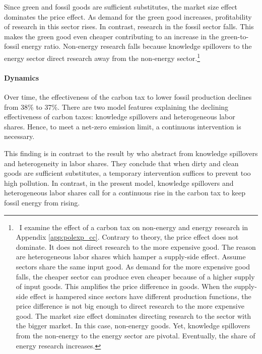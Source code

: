  Since green and fossil goods are sufficient substitutes, the market size effect dominates the price effect. As demand for the green good increases, profitability of research in  this sector rises. In contrast, research in the fossil sector falls. This makes the green good even cheaper contributing to an increase in the green-to-fossil energy ratio.
Non-energy research falls because knowledge spillovers to the energy sector direct research away from the non-energy sector.\footnote{\ I examine the effect of a carbon tax on non-energy and energy research in Appendix \ref{app:polexp_cc}. Contrary to theory, the price effect does not dominate. It does not direct research to the more expensive good. The reason are heterogeneous labor shares which hamper a supply-side effect. Assume sectors share the same input good. As demand for the more expensive good falls, the cheaper sector can produce even cheaper because of a higher supply of input goods. This amplifies the price difference in goods. When the supply-side effect is hampered since sectors have different production functions, the price difference is not big enough to direct research to the more expensive good. The market size effect dominates directing research to the sector with the bigger market. In this case, non-energy goods. Yet, knowledge spillovers from the non-energy to the energy sector are pivotal. Eventually, the share of energy research increases.}
 
\paragraph{Dynamics}

Over time, the effectiveness of the carbon tax to lower fossil production declines from 38\% to 37\%. There are two model features explaining the declining effectiveness of carbon taxes: knowledge spillovers and heterogeneous labor shares. Hence, to meet a net-zero emission limit, a continuous intervention is necessary. 

This finding is in contrast to the result by \cite{Acemoglu2012TheChange} who abstract from knowledge spillovers and heterogeneity in labor shares. They conclude that when dirty and clean goods are sufficient substitutes, a temporary intervention suffices to prevent too high pollution. In contrast, in the present model, knowledge spillovers and heterogeneous labor shares 
call for a continuous rise in the carbon tax to keep fossil energy from rising. 

